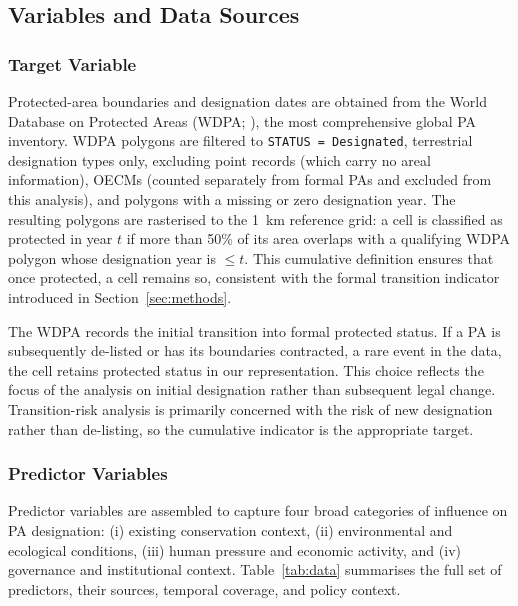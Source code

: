 \documentclass[12pt]{article}
\theoremstyle{break}
\begin{document}
\subsection{Variables and Data Sources}
\label{sec:data}

\subsubsection{Target Variable}
\label{sec:target}

Protected-area boundaries and designation dates are obtained from the World Database
on Protected Areas (WDPA; \citealp{wdpa, unepwcmc2026}),
the most comprehensive global PA inventory. WDPA polygons are filtered to
\texttt{STATUS~=~Designated}, terrestrial designation types only, excluding point
records (which carry no areal information), OECMs (counted separately from formal PAs
and excluded from this analysis), and polygons with a missing or zero designation year. 
The resulting polygons are rasterised to the 1~km reference grid: a cell
is classified as protected in year $t$ if more than 50\% of its area overlaps with a
qualifying WDPA polygon whose designation year is $\leq t$. This cumulative definition
ensures that once protected, a cell remains so, consistent with the formal transition
indicator introduced in Section~\ref{sec:methods}.

The WDPA records the initial transition into formal protected status. If a PA is
subsequently de-listed or has its boundaries contracted, a rare event in
the data, the cell retains protected status in our representation. This choice
reflects the focus of the analysis on initial designation rather than subsequent
legal change.
Transition-risk analysis is primarily concerned with the risk of new designation
rather than de-listing, so the cumulative indicator is the appropriate target.

\subsubsection{Predictor Variables}
\label{sec:predictors}

Predictor variables are assembled to capture four broad categories of influence on
PA designation: (i) existing conservation context, (ii) environmental and ecological
conditions, (iii) human pressure and economic activity, and (iv) governance and institutional context. Table~\ref{tab:data}
summarises the full set of predictors, their sources, temporal coverage, and policy context.
\end{document}
